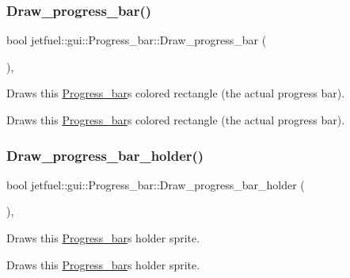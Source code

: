 \subsubsection{\texorpdfstring{Draw\+\_\+progress\+\_\+bar()}{Draw\_progress\_bar()}}
{\footnotesize\ttfamily bool jetfuel\+::gui\+::\+Progress\+\_\+bar\+::\+Draw\+\_\+progress\+\_\+bar (\begin{DoxyParamCaption}{ }\end{DoxyParamCaption})\hspace{0.3cm}{\ttfamily [inline]}, {\ttfamily [protected]}}



Draws this \hyperlink{classjetfuel_1_1gui_1_1Progress__bar}{Progress\+\_\+bar}\textquotesingle{}s colored rectangle (the actual progress bar). 

Draws this \hyperlink{classjetfuel_1_1gui_1_1Progress__bar}{Progress\+\_\+bar}\textquotesingle{}s colored rectangle (the actual progress bar). \mbox{\label{classjetfuel_1_1gui_1_1Progress__bar_a97bc9fab7b77a271db47f91c95af8672}} 
\subsubsection{\texorpdfstring{Draw\+\_\+progress\+\_\+bar\+\_\+holder()}{Draw\_progress\_bar\_holder()}}
{\footnotesize\ttfamily bool jetfuel\+::gui\+::\+Progress\+\_\+bar\+::\+Draw\+\_\+progress\+\_\+bar\+\_\+holder (\begin{DoxyParamCaption}{ }\end{DoxyParamCaption})\hspace{0.3cm}{\ttfamily [inline]}, {\ttfamily [protected]}}



Draws this \hyperlink{classjetfuel_1_1gui_1_1Progress__bar}{Progress\+\_\+bar}\textquotesingle{}s holder sprite. 

Draws this \hyperlink{classjetfuel_1_1gui_1_1Progress__bar}{Progress\+\_\+bar}\textquotesingle{}s holder sprite. \mbox{\label{classjetfuel_1_1gui_1_1Progress__bar_a6c9fdfbed3600490da1a9f1fb4a76003}} 
